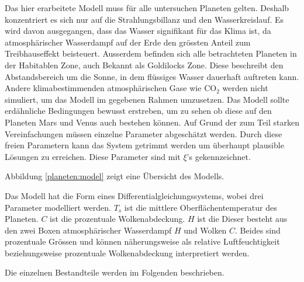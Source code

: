 \begin{refsection}
	

	
	
	
	Das hier erarbeitete Modell muss für alle untersuchen Planeten gelten. Deshalb konzentriert es sich nur auf die Strahlungsbillanz und den Wasserkreislauf. Es wird davon ausgegangen, dass das Wasser signifikant für das Klima ist, da atmosphärischer Wasserdampf auf der Erde den grössten Anteil zum Treibhauseffekt beisteuert. Ausserdem befinden sich alle betrachteten Planeten in der Habitablen Zone, auch Bekannt als Goldilocks Zone. Diese beschreibt den Abstandsbereich um die Sonne, in dem flüssiges Wasser dauerhaft auftreten kann.
	Andere klimabestimmenden atmosphärischen Gase wie $\text{CO}_\text{2}$ werden nicht simuliert, um das Modell im gegebenen Rahmen umzusetzen.
	Das Modell sollte erdähnliche Bedingungen bewusst erstreben, um zu sehen ob diese auf den Planeten Mars und Venus auch bestehen können.
Auf Grund der zum Teil starken Vereinfachungen müssen einzelne Parameter abgeschätzt werden. Durch diese freien Parametern kann das System getrimmt werden um überhaupt plausible Lösungen zu erreichen. Diese Parameter sind mit $\xi$'s gekennzeichnet.


	Abbildung \ref{planeten:model} zeigt eine Übersicht des Modells.
	
	Das Modell hat die Form eines Differentialgleichungssystems, wobei drei Parameter modelliert werden.
	$T_s$ ist die mittlere Oberflächentemperatur des Planeten. 
	$C$ ist die prozentuale Wolkenabdeckung.
	$H$ ist die 
	Dieser besteht aus den zwei Boxen atmosphärischer Wasserdampf $H$ und Wolken $C$. Beides sind prozentuale Grössen und können näherungsweise als relative Luftfeuchtigkeit beziehungsweise prozentuale Wolkenabdeckung interpretiert werden.
	
	
	
	
	Die einzelnen Bestandteile werden im Folgenden beschrieben.



	


\end{refsection}
